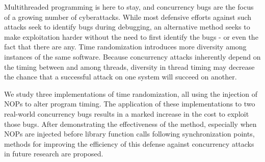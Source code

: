 Multithreaded programming is here to stay, and concurrency bugs are the focus of a growing number of cyberattacks.
While most defensive efforts against such attacks seek to identify bugs during debugging, an alternative method seeks to make exploitation harder without the need to first identify the bugs - or even the fact that there are any.
Time randomization introduces more diversity among instances of the same software.
Because concurrency attacks inherently depend on the timing between and among threads, diversity in thread timing may decrease the chance that a successful attack on one system will succeed on another.

We study three implementations of time randomization, all using the injection of NOPs to alter program timing.
The application of these implementations to two real-world concurrency bugs results in a marked increase in the cost to exploit those bugs.
After demonstrating the effectiveness of the method, especially when NOPs are injected before library function calls following synchronization points, methods for improving the efficiency of this defense against concurrency attacks in future research are proposed.
